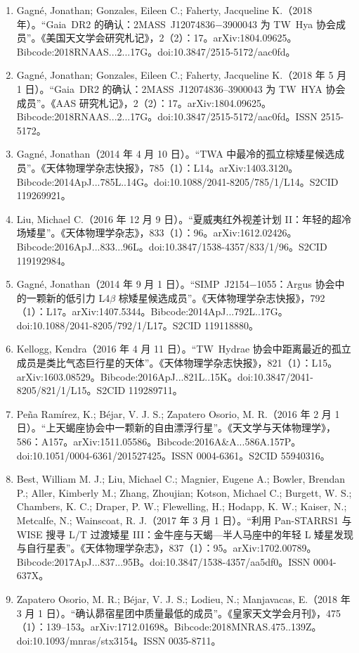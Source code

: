 \begin{enumerate}
\item Gagné, Jonathan; Gonzales, Eileen C.; Faherty, Jacqueline K.（2018 年）。“Gaia~DR2 的确认：2MASS~J12074836$-$3900043 为 TW~Hya 协会成员”。《美国天文学会研究札记》，2（2）：17。arXiv:1804.09625。Bibcode:2018RNAAS...2...17G。doi:10.3847/2515-5172/aac0fd。  
\item Gagné, Jonathan; Gonzales, Eileen C.; Faherty, Jacqueline K.（2018 年 5 月 1 日）。“Gaia~DR2 的确认：2MASS~J12074836--3900043 为 TW~HYA 协会成员”。《AAS 研究札记》，2（2）：17。arXiv:1804.09625。Bibcode:2018RNAAS...2...17G。doi:10.3847/2515-5172/aac0fd。ISSN 2515-5172。  
\item Gagné, Jonathan（2014 年 4 月 10 日）。“TWA 中最冷的孤立棕矮星候选成员”。《天体物理学杂志快报》，785（1）：L14。arXiv:1403.3120。Bibcode:2014ApJ...785L..14G。doi:10.1088/2041-8205/785/1/L14。S2CID 119269921。  
\item Liu, Michael C.（2016 年 12 月 9 日）。“夏威夷红外视差计划 II：年轻的超冷场矮星”。《天体物理学杂志》，833（1）：96。arXiv:1612.02426。Bibcode:2016ApJ...833...96L。doi:10.3847/1538-4357/833/1/96。S2CID 119192984。  
\item Gagné, Jonathan（2014 年 9 月 1 日）。“SIMP~J2154$-$1055：Argus 协会中的一颗新的低引力 L4$\beta$ 棕矮星候选成员”。《天体物理学杂志快报》，792（1）：L17。arXiv:1407.5344。Bibcode:2014ApJ...792L..17G。doi:10.1088/2041-8205/792/1/L17。S2CID 119118880。  
\item Kellogg, Kendra（2016 年 4 月 11 日）。“TW~Hydrae 协会中距离最近的孤立成员是类比气态巨行星的天体”。《天体物理学杂志快报》，821（1）：L15。arXiv:1603.08529。Bibcode:2016ApJ...821L..15K。doi:10.3847/2041-8205/821/1/L15。S2CID 119289711。  
\item Peña Ramírez, K.; Béjar, V. J. S.; Zapatero Osorio, M. R.（2016 年 2 月 1 日）。“上天蝎座协会中一颗新的自由漂浮行星”。《天文学与天体物理学》，586：A157。arXiv:1511.05586。Bibcode:2016A\&A...586A.157P。doi:10.1051/0004-6361/201527425。ISSN 0004-6361。S2CID 55940316。  
\item Best, William M. J.; Liu, Michael C.; Magnier, Eugene A.; Bowler, Brendan P.; Aller, Kimberly M.; Zhang, Zhoujian; Kotson, Michael C.; Burgett, W. S.; Chambers, K. C.; Draper, P. W.; Flewelling, H.; Hodapp, K. W.; Kaiser, N.; Metcalfe, N.; Wainscoat, R. J.（2017 年 3 月 1 日）。“利用 Pan-STARRS1 与 WISE 搜寻 L/T 过渡矮星 III：金牛座与天蝎—半人马座中的年轻 L 矮星发现与自行星表”。《天体物理学杂志》，837（1）：95。arXiv:1702.00789。Bibcode:2017ApJ...837...95B。doi:10.3847/1538-4357/aa5df0。ISSN 0004-637X。  
\item Zapatero Osorio, M. R.; Béjar, V. J. S.; Lodieu, N.; Manjavacas, E.（2018 年 3 月 1 日）。“确认昴宿星团中质量最低的成员”。《皇家天文学会月刊》，475（1）：139--153。arXiv:1712.01698。Bibcode:2018MNRAS.475..139Z。doi:10.1093/mnras/stx3154。ISSN 0035-8711。  

\end{enumerate}
